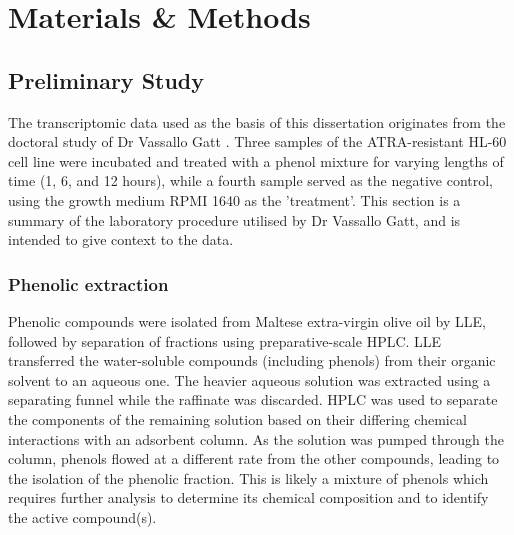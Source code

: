 \chapter{Materials \& Methods}
\label{method}




\section{Preliminary Study}%
\label{method:prelim study}
The transcriptomic data used as the basis of this dissertation originates from the doctoral study of Dr Vassallo Gatt  \citep{Gatt2016}. Three samples of the \ac{ATRA}-resistant HL-60 cell line were incubated and treated with a phenol mixture for varying lengths of time (1, 6, and 12 hours), while a fourth sample served as the negative control, using the growth medium RPMI 1640 as the 'treatment'. This section is a summary of the laboratory procedure utilised by Dr Vassallo Gatt, and is intended to give context to the data.

\subsection{Phenolic extraction}%
Phenolic compounds were isolated from Maltese extra-virgin olive oil by \ac{LLE}, followed by separation of fractions using preparative-scale \ac{HPLC}. \ac{LLE} transferred the water-soluble compounds (including phenols) from their organic solvent to an aqueous one. The heavier aqueous solution was extracted using a separating funnel while the raffinate was discarded. \ac{HPLC} was used to separate the components of the remaining solution based on their differing chemical interactions with an adsorbent column. As the solution was pumped through the column, phenols flowed at a different rate from the other compounds, leading to the isolation of the phenolic fraction. This is likely a mixture of phenols which requires further analysis to determine its chemical composition and to identify the active compound(s).

